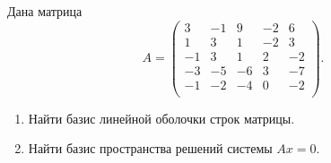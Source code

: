 Дана матрица
\[
	A =
	\begin{pmatrix}
		3  & -1 & 9  & -2 & 6  \\
		1  & 3  & 1  & -2 & 3  \\
		-1 & 3  & 1  & 2  & -2 \\
		-3 & -5 & -6 & 3  & -7 \\
		-1 & -2 & -4 & 0  & -2 \\
	\end{pmatrix}.
\]
\begin{enumerate}
	\item Найти базис линейной оболочки строк матрицы.
	\item Найти базис пространства решений системы $Ax = 0$.
\end{enumerate}